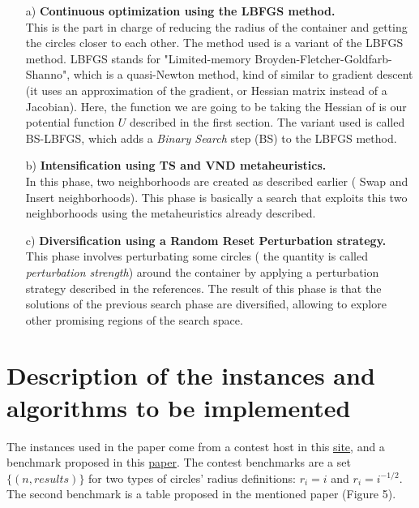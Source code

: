 \documentclass{article}
\begin{document}
\begin{itemize}
\item[a)] \textbf{Continuous optimization using the LBFGS method.}\\
This is the part in charge of reducing the radius of the container and getting the circles closer to each other. The method used is a variant of the LBFGS method. LBFGS stands for "Limited-memory Broyden-Fletcher-Goldfarb-Shanno", which is a quasi-Newton method, kind of similar to gradient descent (it uses an approximation of the gradient, or Hessian matrix instead of a Jacobian). Here, the function we are going to be taking the Hessian of is our potential function $U$ described in the first section. The variant used is called BS-LBFGS, which adds a \textit{Binary Search} step (BS) to the LBFGS method.

\item[b)] \textbf{Intensification using TS and VND metaheuristics.}\\
In this phase, two neighborhoods are created as described earlier ( Swap and Insert neighborhoods). This phase is basically a search that exploits this two neighborhoods using the metaheuristics already described.

\item[c)] \textbf{Diversification using a Random Reset Perturbation strategy.}\\
This phase involves perturbating some circles ( the quantity is called \textit{perturbation strength}) around the container by applying a perturbation strategy described in the references. The result of this phase is that the solutions of the previous search phase are diversified, allowing to explore other promising regions of the search space.

\end{itemize}


\section{Description of the instances and algorithms to be implemented}\label{sec:algorithms}%


The instances used in the paper come from a contest host in this \href{http://www.packomania.com/}{site}, and a benchmark proposed in this \href{http://www.sciencedirect.com/science/article/pii/S0305054805000031?via}{paper}. 
The contest benchmarks are a set $\lbrace (n,results) \rbrace$ for two types of circles' radius definitions: $r_{i}=i$ and $r_{i}=i^{-1/2}$. The second benchmark is a table proposed in the mentioned paper (Figure 5).\\
\end{document}
